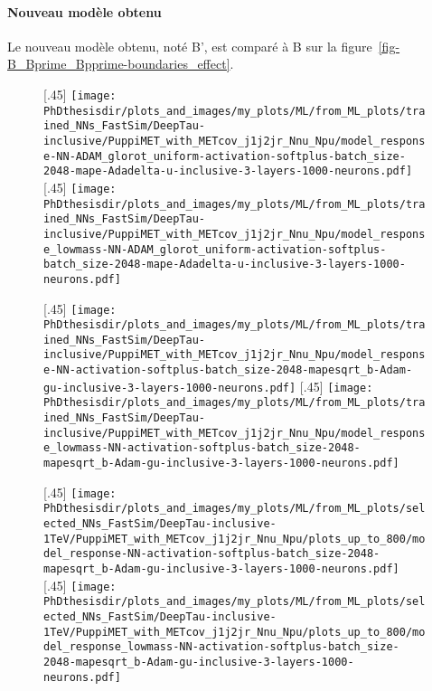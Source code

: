 \paragraph{Nouveau modèle obtenu}
Le nouveau modèle obtenu, noté B', est comparé à B
sur la figure~\ref{fig-B_Bprime_Bpprime-boundaries_effect}.
\begin{figure}[p]
\centering

[.45\textwidth]
{\texttt{[image: \\PhDthesisdir/plots\_and\_images/my\_plots/ML/from\_ML\_plots/trained\_NNs\_FastSim/DeepTau-inclusive/PuppiMET\_with\_METcov\_j1j2jr\_Nnu\_Npu/model\_response-NN-ADAM\_glorot\_uniform-activation-softplus-batch\_size-2048-mape-Adadelta-u-inclusive-3-layers-1000-neurons.pdf]}\vspace{-.5\baselineskip}}
\hfill
{}[.45\textwidth]
{\texttt{[image: \\PhDthesisdir/plots\_and\_images/my\_plots/ML/from\_ML\_plots/trained\_NNs\_FastSim/DeepTau-inclusive/PuppiMET\_with\_METcov\_j1j2jr\_Nnu\_Npu/model\_response\_lowmass-NN-ADAM\_glorot\_uniform-activation-softplus-batch\_size-2048-mape-Adadelta-u-inclusive-3-layers-1000-neurons.pdf]}\vspace{-.5\baselineskip}}

[.45\textwidth]
{\texttt{[image: \\PhDthesisdir/plots\_and\_images/my\_plots/ML/from\_ML\_plots/trained\_NNs\_FastSim/DeepTau-inclusive/PuppiMET\_with\_METcov\_j1j2jr\_Nnu\_Npu/model\_response-NN-activation-softplus-batch\_size-2048-mapesqrt\_b-Adam-gu-inclusive-3-layers-1000-neurons.pdf]}\vspace{-.5\baselineskip}}
\hfill
{}[.45\textwidth]
{\texttt{[image: \\PhDthesisdir/plots\_and\_images/my\_plots/ML/from\_ML\_plots/trained\_NNs\_FastSim/DeepTau-inclusive/PuppiMET\_with\_METcov\_j1j2jr\_Nnu\_Npu/model\_response\_lowmass-NN-activation-softplus-batch\_size-2048-mapesqrt\_b-Adam-gu-inclusive-3-layers-1000-neurons.pdf]}\vspace{-.5\baselineskip}}

[.45\textwidth]
{\texttt{[image: \\PhDthesisdir/plots\_and\_images/my\_plots/ML/from\_ML\_plots/selected\_NNs\_FastSim/DeepTau-inclusive-1TeV/PuppiMET\_with\_METcov\_j1j2jr\_Nnu\_Npu/plots\_up\_to\_800/model\_response-NN-activation-softplus-batch\_size-2048-mapesqrt\_b-Adam-gu-inclusive-3-layers-1000-neurons.pdf]}\vspace{-.5\baselineskip}}
\hfill
{}[.45\textwidth]
{\texttt{[image: \\PhDthesisdir/plots\_and\_images/my\_plots/ML/from\_ML\_plots/selected\_NNs\_FastSim/DeepTau-inclusive-1TeV/PuppiMET\_with\_METcov\_j1j2jr\_Nnu\_Npu/plots\_up\_to\_800/model\_response\_lowmass-NN-activation-softplus-batch\_size-2048-mapesqrt\_b-Adam-gu-inclusive-3-layers-1000-neurons.pdf]}\vspace{-.5\baselineskip}}


\end{figure}
